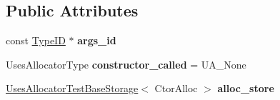 \subsection*{Public Attributes}
\begin{DoxyCompactItemize}
\item 
\mbox{\label{struct_uses_allocator_test_base_a0d50fcf73c097d56d09a97f35a36bbff}} 
const \mbox{\hyperlink{struct_type_i_d}{Type\+ID}} $\ast$ {\bfseries args\+\_\+id}
\item 
\mbox{\label{struct_uses_allocator_test_base_ad614e403eb85f18bfd4b70aabc66f80c}} 
Uses\+Allocator\+Type {\bfseries constructor\+\_\+called} = U\+A\+\_\+\+None
\item 
\mbox{\label{struct_uses_allocator_test_base_a713d732a954b1fc746a0ec6eb8e1a44f}} 
\mbox{\hyperlink{struct_uses_allocator_test_base_storage}{Uses\+Allocator\+Test\+Base\+Storage}}$<$ Ctor\+Alloc $>$ {\bfseries alloc\+\_\+store}
\end{DoxyCompactItemize}
